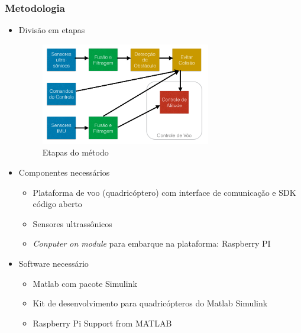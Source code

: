 \documentclass{beamer}
\begin{document}
\begin{frame}[allowframebreaks]
	
	\frametitle{Metodologia}
	
	\begin{itemize}
	
		\item Divisão em etapas
		
		\begin{figure}[h]
			\centering
			\includegraphics[keepaspectratio = true,
			width=0.7\textwidth]{img/etapasMetodo.png}
			\caption{Etapas do método}
			\label{fig:etapasMetodo}
		\end{figure}
		
	\framebreak
	
		\item Componentes necessários
		\begin{itemize}	
			
			\item Plataforma de voo (quadricóptero) com interface de comunicação e SDK código aberto
			
			\item Sensores ultrassônicos
			
			\item \textit{Conputer on module} para embarque na plataforma: Raspberry PI
				
		\end{itemize}
		
		\item Software necessário
		\begin{itemize}	
			
			\item Matlab com pacote Simulink
			
			\item Kit de desenvolvimento para quadricópteros do Matlab Simulink
			
			\item Raspberry Pi Support from MATLAB
			

\end{itemize}
\end{itemize}
\end{frame}
\end{document}

